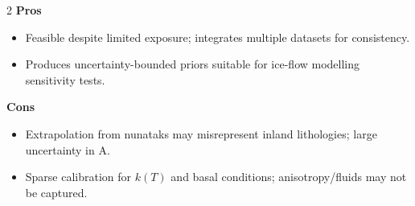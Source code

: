 \documentclass[11pt,a4paper]{article}
\begin{document}
\begin{multicols}{2}
\textbf{Pros}
\begin{itemize}[leftmargin=*]
  \item Feasible despite limited exposure; integrates multiple datasets for consistency.\label{notesref}
  \item Produces uncertainty-bounded priors suitable for ice-flow modelling sensitivity tests.
\end{itemize}
\columnbreak
\textbf{Cons}
\begin{itemize}[leftmargin=*]
  \item Extrapolation from nunataks may misrepresent inland lithologies; large uncertainty in A.\label{notesref}
  \item Sparse calibration for $k(T)$ and basal conditions; anisotropy/fluids may not be captured.
\end{itemize}
\end{multicols}
\end{document}
